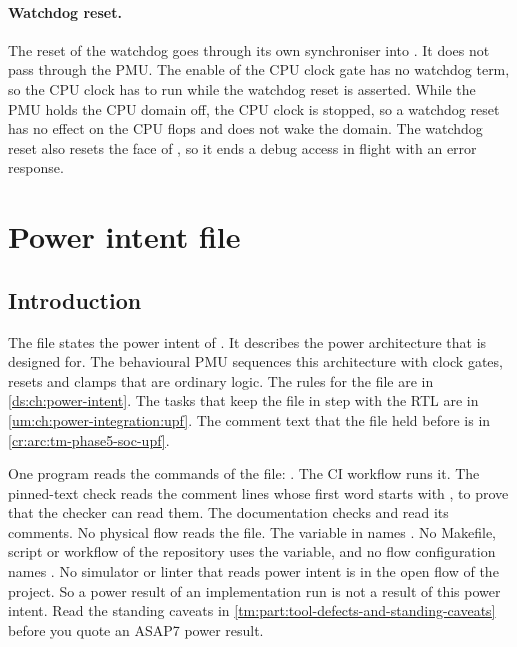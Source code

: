 \paragraph{Watchdog reset.} The reset of the watchdog goes through its own synchroniser into . It does not pass through the PMU. The enable of the CPU clock gate has no watchdog term, so the CPU clock has to run while the watchdog reset is asserted. While the PMU holds the CPU domain off, the CPU clock is stopped, so a watchdog reset has no effect on the CPU flops and does not wake the domain. The watchdog reset also resets the  face of , so it ends a debug access in flight with an error response.

\section{Power intent file}\label{tm:pd:phase5-soc-upf}

\subsection{Introduction}
The file  states the power intent of . It describes the power architecture that  is designed for. The behavioural PMU sequences this architecture with clock gates, resets and clamps that are ordinary logic. The rules for the file are in \cref{ds:ch:power-intent}. The tasks that keep the file in step with the RTL are in \cref{um:ch:power-integration:upf}. The comment text that the file held before is in \cref{cr:arc:tm-phase5-soc-upf}.

One program reads the commands of the file: . The CI workflow  runs it. The pinned-text check  reads the comment lines whose first word starts with , to prove that the checker can read them. The documentation checks  and  read its comments. No physical flow reads the file. The variable  in  names . No Makefile, script or workflow of the repository uses the variable, and no flow configuration names . No simulator or linter that reads power intent is in the open flow of the project. So a power result of an implementation run is not a result of this power intent. Read the standing caveats in \cref{tm:part:tool-defects-and-standing-caveats} before you quote an ASAP7 power result.

